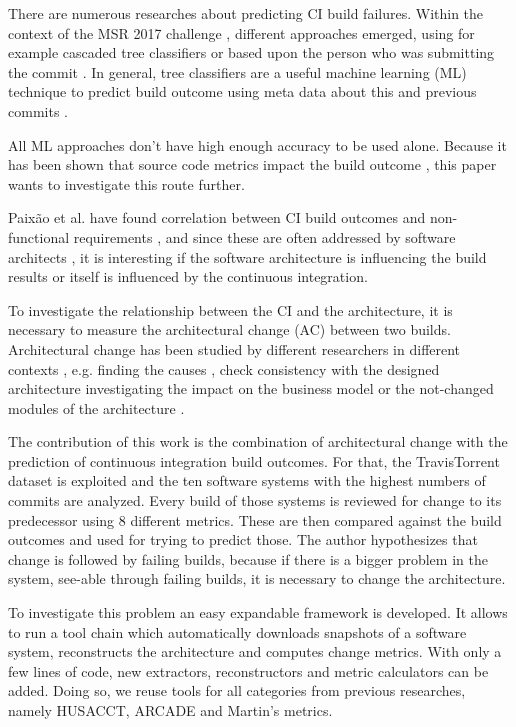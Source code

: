 \documentclass[conference]{IEEEtran}
\begin{document}
There are numerous researches about predicting CI build failures. Within the context of the MSR 2017 challenge \cite{TravisTorrent}, different approaches emerged, using for example cascaded tree classifiers \cite{Pred-Cascade} or based upon the person who was submitting the commit \cite{ContrInvolv}. In general, tree classifiers are a useful machine learning (ML) technique to predict build outcome using meta data about this and previous commits \cite{Pred-Tree, ML-Project}. 

All ML approaches don't have high enough accuracy to be used alone. Because it has been shown that source code metrics impact the build outcome \cite{FailsCorr}, this paper wants to investigate this route further. 

Paixão et al. have found correlation between CI build outcomes and non-functional requirements \cite{Fail-NFReq}, and since these are often addressed by software architects \cite{NFR-Architects}, it is interesting if the software architecture is influencing the build results or itself is influenced by the continuous integration. 

To investigate the relationship between the CI and the architecture, it is necessary to measure the architectural change (AC) between two builds. Architectural change has been studied by different researchers in different contexts \cite{Aramis,StructDist,Arc-MDSE,Arcade-Base} , e.g.  finding the causes \cite{AC-Causes}, check consistency with the designed architecture \cite{ArcConf, ArcCons} investigating the impact on the business model \cite{ArcChange-Business} or the not-changed modules of the architecture \cite{Knowledge-AC}. 

The contribution of this work is the combination of architectural change with the prediction of continuous integration build outcomes. For that, the TravisTorrent dataset is exploited and the ten software systems with the highest numbers of commits are analyzed. Every build of those systems is reviewed for change to its predecessor using 8 different metrics. These are then compared against the build outcomes and used for trying to predict those. The author hypothesizes that change is followed by failing builds, because if there is a bigger problem in the system, see-able through failing builds, it is necessary to change the architecture. 

To investigate this problem an easy expandable framework is developed. It allows to run a tool chain which automatically downloads snapshots of a software system, reconstructs the architecture and computes change metrics. With only a few lines of code, new extractors, reconstructors and metric calculators can be added. Doing so, we reuse tools for all categories from previous researches, namely HUSACCT, ARCADE and Martin's metrics.
\end{document}
